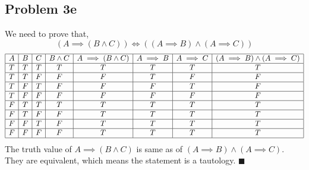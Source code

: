 \documentclass[answers]{exam}
\theoremstyle{mytheoremstyle}
\theoremstyle{mytheoremstyle}
\theoremstyle{myproblemstyle}
\begin{document}
\subsection*{Problem 3e}
\begin{framed}
	We need to prove that,
	\[\left(A\implies( B\land C)\right)\iff \left((A\implies B)\land (A\implies C)\right)\]
	\begin{displaymath}
		\begin{array}{|c|c|c|c|c|c|c|c|}
			\hline
			A & B & C & B\land C & A\implies (B\land C) & A\implies B & A\implies C & (A\implies B) \land (A\implies C) \\\hline
			T & T & T & T        & T                    & T           & T           & T                                 \\\hline
			T & T & F & F        & F                    & T           & F           & F                                 \\\hline
			T & F & T & F        & F                    & F           & T           & F                                 \\\hline
			T & F & F & F        & F                    & F           & F           & F                                 \\\hline
			F & T & T & T        & T                    & T           & T           & T                                 \\\hline
			F & T & F & F        & T                    & T           & T           & T                                 \\\hline
			F & F & T & F        & T                    & T           & T           & T                                 \\\hline
			F & F & F & F        & T                    & T           & T           & T                                 \\\hline
		\end{array}
	\end{displaymath}
	The truth value of \(A\implies(B\land C)\) is same as of \((A\implies B)\land (A\implies C)\). They are equivalent, which means the statement is a tautology. \(\blacksquare\)
\end{framed}
\newpage
\end{document}
